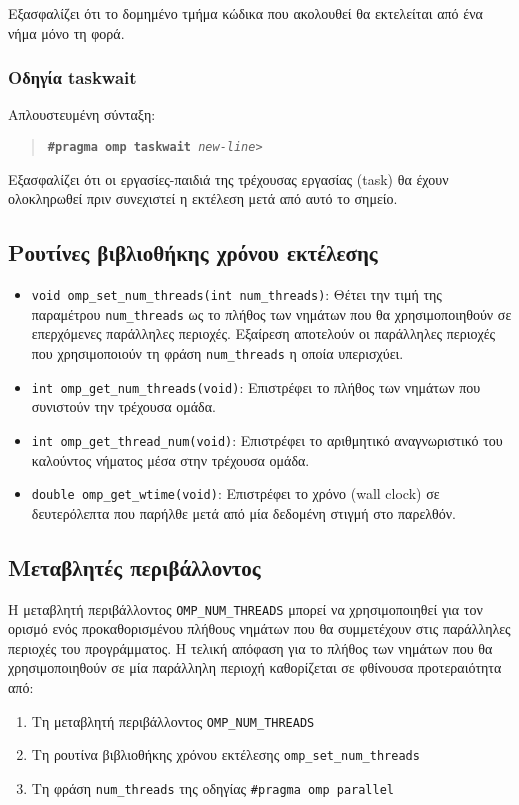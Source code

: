 Εξασφαλίζει ότι το δομημένο τμήμα κώδικα που ακολουθεί θα εκτελείται από ένα νήμα μόνο τη φορά.

\subsubsection{Οδηγία taskwait}
Απλουστευμένη σύνταξη:
\begin{quote}
	\texttt{\textbf{\#pragma omp taskwait} \textit{new-line>}}
\end{quote}

Εξασφαλίζει ότι οι εργασίες-παιδιά της τρέχουσας εργασίας (task) θα έχουν ολοκληρωθεί πριν συνεχιστεί η εκτέλεση μετά από αυτό το σημείο.

\subsection{Ρουτίνες βιβλιοθήκης χρόνου εκτέλεσης}
\begin{itemize}
	\item \texttt{void omp\_set\_num\_threads(int num\_threads)}: Θέτει την τιμή της παραμέτρου \texttt{num\_threads} ως το πλήθος των νημάτων που θα χρησιμοποιηθούν σε επερχόμενες παράλληλες περιοχές. Εξαίρεση αποτελούν οι παράλληλες περιοχές που χρησιμοποιούν τη φράση \texttt{num\_threads} η οποία υπερισχύει.
	\item \texttt{int omp\_get\_num\_threads(void)}: Επιστρέφει το πλήθος των νημάτων που συνιστούν την τρέχουσα ομάδα.
	\item \texttt{int omp\_get\_thread\_num(void)}: Επιστρέφει το αριθμητικό αναγνωριστικό του καλούντος νήματος μέσα στην τρέχουσα ομάδα.
	\item \texttt{double omp\_get\_wtime(void)}: Επιστρέφει το χρόνο (wall clock) σε δευτερόλεπτα που παρήλθε μετά από μία δεδομένη στιγμή στο παρελθόν.
\end{itemize}

\subsection{Μεταβλητές περιβάλλοντος}
Η μεταβλητή περιβάλλοντος \texttt{OMP\_NUM\_THREADS} μπορεί να χρησιμοποιηθεί για τον ορισμό ενός προκαθορισμένου πλήθους νημάτων που θα συμμετέχουν στις παράλληλες περιοχές του προγράμματος. Η τελική απόφαση για το πλήθος των νημάτων που θα χρησιμοποιηθούν σε μία παράλληλη περιοχή καθορίζεται σε φθίνουσα προτεραιότητα από:
\begin{enumerate}
	\item Τη μεταβλητή περιβάλλοντος \texttt{OMP\_NUM\_THREADS}
	\item Τη ρουτίνα βιβλιοθήκης χρόνου εκτέλεσης \texttt{omp\_set\_num\_threads}
	\item Τη φράση \texttt{num\_threads} της οδηγίας \texttt{\#pragma omp parallel}
\end{enumerate}


